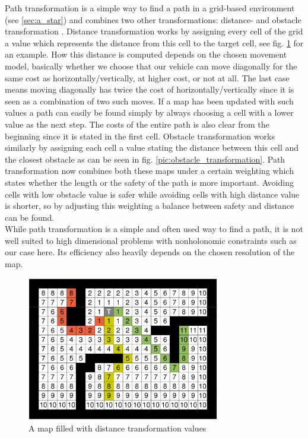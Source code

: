Path transformation is a simple way to find a path in a grid-based environment (see \ref{sec:a_star}) and combines two other transformations: distance- and obstacle transformation \cite{35}. Distance transformation works by assigning every cell of the grid a value which represents the distance from this cell to the target cell, see fig. \ref{pic:distance_transformation} for an example. How this distance is computed depends on the chosen movement model, basically whether we choose that our vehicle can move diagonally for the same cost as horizontally/vertically, at higher cost, or not at all. The last case means moving diagonally has twice the cost of horizontally/vertically since it is seen as a combination of two such moves. If a map has been updated with such values a path can easily be found simply by always choosing a cell with a lower value as the next step. The costs of the entire path is also clear from the beginning since it is stated in the first cell. Obstacle transformation works similarly by assigning each cell a value stating the distance between this cell and the closest obstacle as can be seen in fig. \ref{pic:obstacle_transformation}. Path transformation now combines both these maps under a certain weighting which states whether the length or the safety of the path is more important. Avoiding cells with low obstacle value is safer while avoiding cells with high distance value is shorter, so by adjusting this weighting a balance between safety and distance can be found. \\
While path transformation is a simple and often used way to find a path, it is not well suited to high dimensional problems with nonholonomic constraints such as our case here. Its efficiency also heavily depends on the chosen resolution of the map.

\begin{figure}[b]
\centering
\includegraphics[width=0.75\textwidth]{./Chapters/Figures/distance_transformation.png}
\caption{A map filled with distance transformation values\label{pic:distance_transformation}}
\end{figure}

